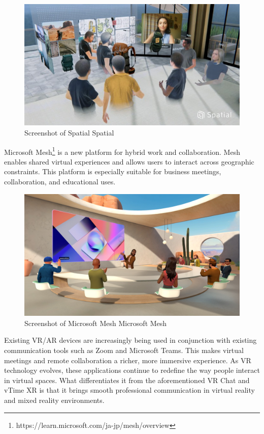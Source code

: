 \documentclass[12pt]{article}
\begin{document}
\begin{figure}[H]
    \centering
    \includegraphics[width=1\textwidth]{spatial.jpg}
    \caption{Screenshot of Spatial \textcopyright Spatial}
    \label{fig:my_label}
\end{figure}

Microsoft Mesh\footnote{https://learn.microsoft.com/ja-jp/mesh/overview} is a
new platform for hybrid work and collaboration. Mesh
enables shared virtual experiences and allows users to interact across
geographic constraints. This platform is especially suitable for business
meetings, collaboration, and educational uses.

\begin{figure}[H]
    \centering
    \includegraphics[width=1\textwidth]{mesh.png}
    \caption{Screenshot of Microsoft Mesh \textcopyright Microsoft Mesh}
    \label{fig:my_label}
\end{figure}

Existing VR/AR devices are increasingly being used in conjunction with existing
communication tools such as Zoom and Microsoft Teams. This makes virtual
meetings and remote collaboration a richer, more immersive experience. As VR
technology evolves, these applications continue to redefine the way people
interact in virtual spaces. What differentiates it from the aforementioned VR
Chat and vTime XR is that it brings smooth professional communication in
virtual reality and mixed reality environments.
\end{document}
